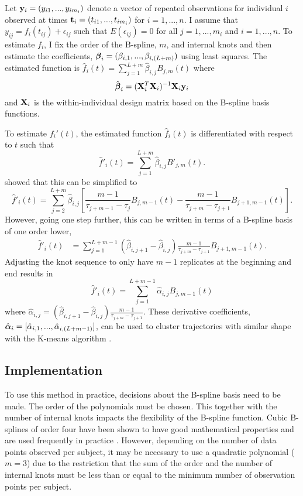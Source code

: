 Let $\mathbf y_{i}=(y_{i1},...,y_{im_{i}})$ denote a vector of repeated observations for individual $i$ observed at times $\mathbf t_{i}=(t_{i1},...,t_{im_{i}})$  for $i=1,...,n$. I assume that $y_{ij} = f_{i}(t_{ij}) + \epsilon_{ij}$ such that $E(\epsilon_{ij}) = 0$ for all $j=1,...,m_{i}$ and $i=1,...,n$.  To estimate $f_{i}$, I fix the order of the B-spline, $m$, and internal knots and then estimate the coefficients, $\boldsymbol \beta_{i} = (\beta_{i,1},...,\beta_{i, (L+m)})$ using least squares. The estimated function is $\hat{f}_i(t)=\sum^{L+m}_{j=1} \hat{\beta}_{i,j} B_{j,m}(t)$ where
$$\hat{\boldsymbol \beta}_{i} = (\mathbf X_{i}^{T}\mathbf X_{i})^{-1}\mathbf X_{i}\mathbf y_{i}$$
and $\mathbf X_{i}$ is the within-individual design matrix based on the B-spline basis functions. 

To estimate $f_i'(t)$, the estimated function $\hat{f}_i(t)$ is differentiated with respect to $t$ such that
$$\hat{f}'_i(t)=\sum^{L+m}_{j=1} \hat{\beta}_{i,j} B'_{j,m}(t).$$
\Textcite{prochazkova2005} showed that this can be simplified to
$$\hat{f}'_i(t)=\sum^{L+m}_{j=2} \hat{\beta}_{i,j} \left[\frac{m-1}{\tau_{j+m-1}-\tau_j} B_{j,m-1}(t)-\frac{m-1}{\tau_{j+m}-\tau_{j+1}} B_{j+1,m-1}(t)\right].$$
However, going one step further, this can be written in terms of a B-spline basis of one order lower,
\begin{align*}
\hat{f}'_i(t)&=\sum^{L+m-1}_{j=1} (\hat{\beta}_{i,j+1} -\hat{\beta}_{i,j})\frac{m-1}{\tau_{j+m}-\tau_{j+1} }B_{j+1,m-1}(t).
\end{align*}
Adjusting the knot sequence to only have $m-1$ replicates at the beginning and end results in
$$\hat{f}'_i(t)=\sum^{L+m-1}_{j=1}\hat{\alpha}_{i,j}B_{j,m-1}(t)$$
where $\hat{\alpha}_{i,j}= (\hat{\beta}_{i,j+1} -\hat{\beta}_{i,j})\frac{m-1}{\tau_{j+m}-\tau_{j+1} }$.
These derivative coefficients, $\hat{\boldsymbol \alpha}_{i} = [\hat{\alpha}_{i,1},...,\hat{\alpha}_{i,(L+m-1)}]$, can be used to cluster trajectories with similar shape with the K-means algorithm \cite{macqueen1967, hartigan1979}. 

\subsection{Implementation}
To use this method in practice, decisions about the B-spline basis need to be made. The order of the polynomials must be chosen. This together with the number of internal knots impacts the flexibility of the B-spline function. Cubic B-splines of order four have been shown to have good mathematical properties and are used frequently in practice \cite{james2003}. However, depending on the number of data points observed per subject, it may be necessary to use a quadratic polynomial ($m = 3$) due to the restriction that the sum of the order and the number of internal knots must be less than or equal to the minimum number of observation points per subject. 

